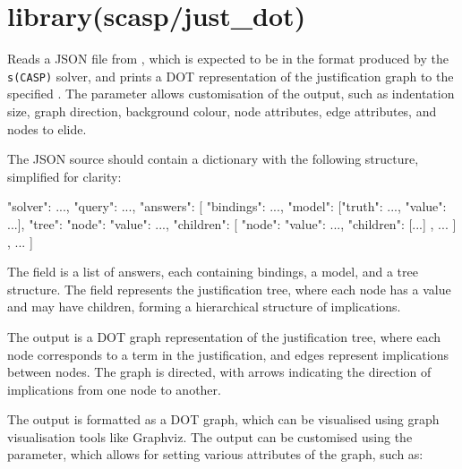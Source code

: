 \chapter{library(scasp/just_dot)}\label{sec:justdot}

\begin{description}
Reads a JSON file from , which is expected to be in the format
produced by the \verb$s(CASP)$ solver, and prints a DOT representation of the
justification graph to the specified . The  parameter
allows customisation of the output, such as indentation size, graph
direction, background colour, node attributes, edge attributes, and
nodes to elide.

The JSON source should contain a dictionary with the following structure,
simplified for clarity:

\begin{code}
{
    "solver": {...},
    "query": {...},
    "answers": [
        {
            "bindings": {...},
            "model": [{"truth": ..., "value": {...}}],
            "tree": {
                "node": {"value": {...}},
                "children": [
                    {
                        "node": {"value": {...}},
                        "children": [...]
                    },
                    ...
                ]
            }
        },
        ...
    ]
}
\end{code}

The  field is a list of answers, each containing bindings, a
model, and a tree structure. The  field represents the
justification tree, where each node has a value and may have children,
forming a hierarchical structure of implications.

The output is a DOT graph representation of the justification tree,
where each node corresponds to a term in the justification, and edges
represent implications between nodes. The graph is directed, with arrows
indicating the direction of implications from one node to another.

The output is formatted as a DOT graph, which can be visualised using
graph visualisation tools like Graphviz. The output can be customised
using the  parameter, which allows for setting various attributes
of the graph, such as:


\end{description}
